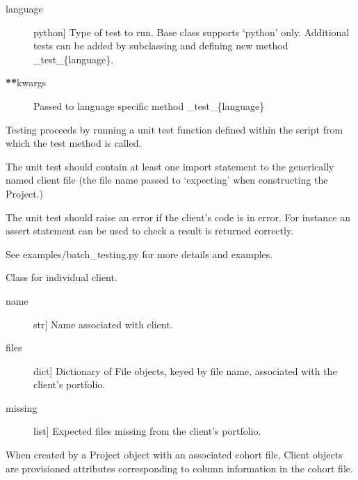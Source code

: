 \documentclass[letterpaper,10pt,english]{sphinxmanual}
\begin{document}
\begin{fulllineitems}
\begin{fulllineitems}
\begin{description}
\item[{language}] \leavevmode{[}python{]}
Type of test to run. Base class supports ‘python’ only. Additional tests can
be added by subclassing and defining new method \_test\_\{language\}.

\item[{{\color{red}\bfseries{}**}kwargs }] \leavevmode
Passed to language specific method \_test\_\{language\}

\end{description}

Testing proceeds by running a unit test function defined within the script from
which the test method is called.

The unit test should contain at least one import statement to the generically
named client file (the file name passed to ‘expecting’ when constructing the Project.)

The unit test should raise an error if the client’s code is in error. For instance
an assert statement can be used to check a result is returned correctly.

See examples/batch\_testing.py for more details and examples.

\end{fulllineitems}


\end{fulllineitems}


\begin{fulllineitems}
\label{\detokenize{index:unicity.Client}}
Class for individual client.
\begin{description}
\item[{name}] \leavevmode{[}str{]}
Name associated with client.

\item[{files}] \leavevmode{[}dict{]}
Dictionary of File objects, keyed by file name, associated with the 
client’s portfolio.

\item[{missing}] \leavevmode{[}list{]}
Expected files missing from the client’s portfolio.

\end{description}

When created by a Project object with an associated cohort file, Client
objects are provisioned attributes corresponding to column information
in the cohort file.

\end{fulllineitems}
\end{document}
